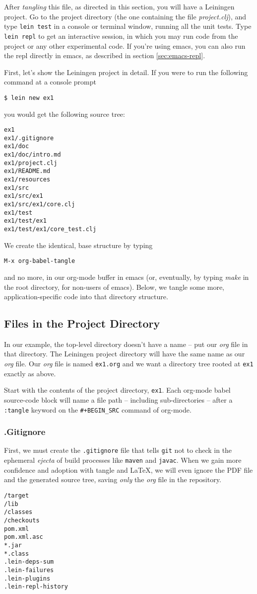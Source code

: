 \documentclass[11pt]{article}
\begin{document}
After \emph{tangling} this file, as directed in this section, you will
have a Leiningen project. Go to the project directory (the one
containing the file \emph{project.clj}), and type \verb|lein test| in a
console or terminal window, running all the unit tests. Type
\verb|lein repl| to get an interactive session, in which you may run
code from the project or any other experimental code. If you're
using emacs, you can also run the repl directly in emacs, as
described in section \ref{sec:emacs-repl}.

First, let's show the Leiningen project in detail. If you were to
run the following command at a console prompt
\begin{verbatim}
$ lein new ex1
\end{verbatim}
you would get the following source tree:
\begin{verbatim}
ex1
ex1/.gitignore
ex1/doc
ex1/doc/intro.md
ex1/project.clj
ex1/README.md
ex1/resources
ex1/src
ex1/src/ex1
ex1/src/ex1/core.clj
ex1/test
ex1/test/ex1
ex1/test/ex1/core_test.clj
\end{verbatim}
We create the identical, base structure by typing
\begin{verbatim}
M-x org-babel-tangle
\end{verbatim}
and no more, in our org-mode buffer in emacs (or, eventually, by
typing \emph{make} in the root directory, for non-users of emacs). Below,
we tangle some more, application-specific code into that directory
structure.

\subsection{Files in the Project Directory}
\label{sec-2-1}
In our example, the top-level directory doesn't have a name --
put our \emph{org} file in that directory. The Leiningen project directory
will have the same name as our \emph{org} file. Our \emph{org} file is named
\verb+ex1.org+ and we want a directory tree rooted at \verb+ex1+
exactly as above.

Start with the contents of the project directory, \verb+ex1+. Each
org-mode babel source-code block will name a file path -- including
sub-directories -- after a \verb+:tangle+ keyword on the
\texttt{\#+BEGIN\_SRC} command of org-mode.
\subsubsection{.Gitignore}
\label{sec-2-1-1}
First, we must create the \verb+.gitignore+ file that tells
\verb+git+ not to check in the ephemeral \emph{ejecta} of build
processes like \verb+maven+ and \verb+javac+. When we gain more
confidence and adoption with tangle and \LaTeX{}, we will even
ignore the PDF file and the generated source tree, saving \emph{only}
the \emph{org} file in the repository.
\begin{verbatim}
/target
/lib
/classes
/checkouts
pom.xml
pom.xml.asc
*.jar
*.class
.lein-deps-sum
.lein-failures
.lein-plugins
.lein-repl-history
\end{verbatim}
\end{document}
